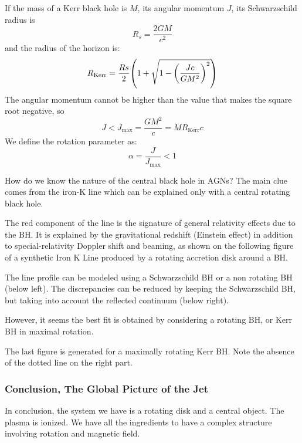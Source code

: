 \documentclass[10pt,a4paper,english]{article}
\let\originalleft\left
\let\originalright\right
\renewcommand{\left}{\mathopen{}\mathclose\bgroup\originalleft}
\renewcommand{\right}{\aftergroup\egroup\originalright}
\begin{document}
If the mass of a Kerr black hole is $M$, its angular momentum $J$, its
Schwarzschild radius is
\begin{equation}
  R_s = \frac{2GM}{c^2}
\end{equation}
and the radius of the horizon is:
\begin{equation}
  R_\mathrm{Kerr} = \frac{Rs}{2} \left( 1 + \sqrt{1-\left( \frac{Jc}{GM^2} \right)^2 } \right)
\end{equation}
The angular momentum cannot be higher than the value that makes the
square root negative, so
\begin{equation}
  J < J_\mathrm{max} = \frac{GM^2}{c} = MR_\mathrm{Kerr}c
\end{equation}
We define the rotation parameter as:
\begin{equation}
  \alpha = \frac{J}{J_\mathrm{max}} < 1
\end{equation}

How do we know the nature of the central black hole in AGNs? The main
clue comes from the iron-K line which can be explained only with a
central rotating black hole.


The red component of the line is the signature of general relativity
effects due to the BH. It is explained by the gravitational redshift
(Einstein effect) in addition to special-relativity Doppler shift and
beaming, as shown on the following figure of a synthetic Iron K Line
produced by a rotating accretion disk around a BH.


The line profile can be modeled using a Schwarzschild BH or a non
rotating BH (below left). The discrepancies can be reduced by keeping
the Schwarzschild BH, but taking into account the reflected continuum
(below right).


However, it seems the best fit is obtained by considering a rotating
BH, or Kerr BH in maximal rotation.

The last figure is generated for a maximally rotating Kerr BH. Note
the absence of the dotted line on the right part.
\subsubsection{Conclusion, The Global Picture of the Jet}

In conclusion, the system we have is a rotating disk and a central
object. The plasma is ionized. We have all the ingredients to have a complex
structure involving rotation and magnetic field.
\end{document}
